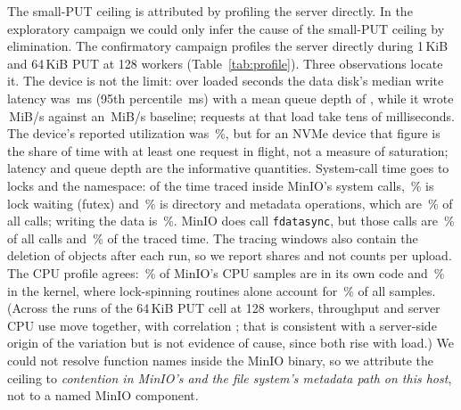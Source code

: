 \documentclass[conference]{IEEEtran}
\newcommand{\lab}[1]{\textsf{#1}}
\begin{document}
The small-PUT ceiling is attributed by profiling the server directly. In the exploratory campaign we could only infer
the cause of the small-PUT ceiling by elimination. The confirmatory campaign profiles the server
directly during 1\,KiB and 64\,KiB PUT at 128 workers (Table~\ref{tab:profile}). Three
observations locate it. The device is not the limit: over \RevProfDiskSeconds{} loaded
seconds the data disk's median write latency was \RevProfDiskAwait\,ms (95th percentile
\RevProfDiskAwaitPninetyfive\,ms) with a mean queue depth of \RevProfDiskQueue, while it wrote
\RevProfDiskWriteMib\,MiB/s against an \RevDiskWrite\,MiB/s baseline; requests at that load take
tens of milliseconds. The device's reported utilization was \RevProfDiskUtil\,\%, but for an
NVMe device that figure is the share of time with at least one request in flight, not a measure
of saturation; latency and queue depth are the informative quantities. System-call time goes to locks and the namespace: of the time traced
inside MinIO's system calls, \RevProfFutexTime\,\% is lock waiting (futex) and
\RevProfNamespaceTime\,\% is directory and metadata operations, which are
\RevProfNamespaceCalls\,\% of all calls; writing the data is \RevProfWriteTime\,\%. MinIO does
call \texttt{fdatasync}, but those calls are \RevProfSyncCalls\,\% of all calls and
\RevProfSyncTime\,\% of the traced time. The tracing windows also contain the deletion of
objects after each run, so we report shares and not counts per upload. The CPU profile agrees: \RevProfCpuUser\,\% of MinIO's CPU samples are in
its own code and \RevProfCpuKernel\,\% in the kernel, where lock-spinning routines alone account
for \RevProfCpuKernelLocks\,\% of all samples. (Across the \RevNoisyRuns{} runs of the 64\,KiB PUT
cell at 128 workers, throughput and server CPU use move together, with correlation
\RevNoisyCpuCorr; that is consistent with a server-side origin of the variation but is not
evidence of cause, since both rise with load.) We could not resolve function names inside the MinIO binary, so we attribute
the ceiling to \emph{contention in MinIO's and the file system's metadata path on this host}, not
to a named MinIO component.

\begin{table}[t]
\caption{Where MinIO's system-call time goes during small-object PUT at 128 workers (\RevProfStraceCycles{} tracing windows, \lab{Profiling}). Runs under tracing are slowed and supply no performance numbers.}
\label{tab:profile}
\centering\footnotesize

\end{table}
\end{document}
